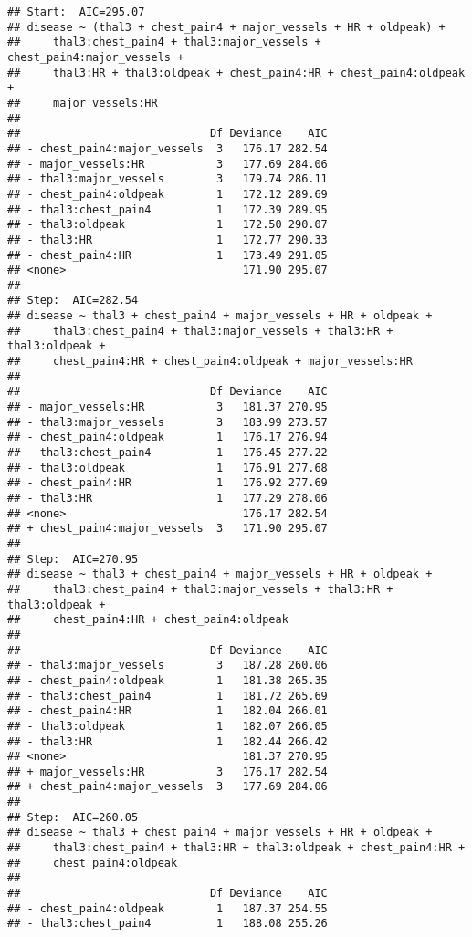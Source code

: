 \documentclass[]{article}
\begin{document}
\begin{verbatim}
## Start:  AIC=295.07
## disease ~ (thal3 + chest_pain4 + major_vessels + HR + oldpeak) + 
##     thal3:chest_pain4 + thal3:major_vessels + chest_pain4:major_vessels + 
##     thal3:HR + thal3:oldpeak + chest_pain4:HR + chest_pain4:oldpeak + 
##     major_vessels:HR
## 
##                             Df Deviance    AIC
## - chest_pain4:major_vessels  3   176.17 282.54
## - major_vessels:HR           3   177.69 284.06
## - thal3:major_vessels        3   179.74 286.11
## - chest_pain4:oldpeak        1   172.12 289.69
## - thal3:chest_pain4          1   172.39 289.95
## - thal3:oldpeak              1   172.50 290.07
## - thal3:HR                   1   172.77 290.33
## - chest_pain4:HR             1   173.49 291.05
## <none>                           171.90 295.07
## 
## Step:  AIC=282.54
## disease ~ thal3 + chest_pain4 + major_vessels + HR + oldpeak + 
##     thal3:chest_pain4 + thal3:major_vessels + thal3:HR + thal3:oldpeak + 
##     chest_pain4:HR + chest_pain4:oldpeak + major_vessels:HR
## 
##                             Df Deviance    AIC
## - major_vessels:HR           3   181.37 270.95
## - thal3:major_vessels        3   183.99 273.57
## - chest_pain4:oldpeak        1   176.17 276.94
## - thal3:chest_pain4          1   176.45 277.22
## - thal3:oldpeak              1   176.91 277.68
## - chest_pain4:HR             1   176.92 277.69
## - thal3:HR                   1   177.29 278.06
## <none>                           176.17 282.54
## + chest_pain4:major_vessels  3   171.90 295.07
## 
## Step:  AIC=270.95
## disease ~ thal3 + chest_pain4 + major_vessels + HR + oldpeak + 
##     thal3:chest_pain4 + thal3:major_vessels + thal3:HR + thal3:oldpeak + 
##     chest_pain4:HR + chest_pain4:oldpeak
## 
##                             Df Deviance    AIC
## - thal3:major_vessels        3   187.28 260.06
## - chest_pain4:oldpeak        1   181.38 265.35
## - thal3:chest_pain4          1   181.72 265.69
## - chest_pain4:HR             1   182.04 266.01
## - thal3:oldpeak              1   182.07 266.05
## - thal3:HR                   1   182.44 266.42
## <none>                           181.37 270.95
## + major_vessels:HR           3   176.17 282.54
## + chest_pain4:major_vessels  3   177.69 284.06
## 
## Step:  AIC=260.05
## disease ~ thal3 + chest_pain4 + major_vessels + HR + oldpeak + 
##     thal3:chest_pain4 + thal3:HR + thal3:oldpeak + chest_pain4:HR + 
##     chest_pain4:oldpeak
## 
##                             Df Deviance    AIC
## - chest_pain4:oldpeak        1   187.37 254.55
## - thal3:chest_pain4          1   188.08 255.26

\end{verbatim}
\end{document}
